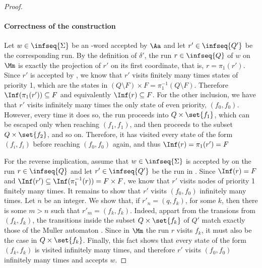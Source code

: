 \begin{proof}
    \paragraph{Correctness of the construction}
    Let $w \in \infseq{\Sigma}$ be an \w-word accepted by $\Aa$ and let $r' \in \infseq{Q'}$
    be the corresponding run.
    By the definition of $\delta'$, the run $r \in \infseq{Q}$ of $w$ on $\Mm$
    is exactly the projection of $r'$ on its first coordinate, that is, $r = \pi_1(r')$.
    Since $r'$ is accepted by \Aa, we know that $r'$
    visits finitely many times states of priority 1, which are the
    states in $(Q \setminus F) \times F = \pi^{-1}_1(Q \setminus F)$.
    Therefore $\Inf(\pi_1(r')) \subseteq F$ and equivalently $\Inf(r) \subseteq F$.
    For the other inclusion, we have that $r'$ visits infinitely many
    times the only state of even priority, $(f_0, f_0)$. However,
    every time it does so, the run proceeds into $Q \times \set{f_1}$,
    which can be escaped only when reaching $(f_1, f_1)$,
    and then proceeds to the subset $Q \times \set{f_2}$, and so on.
    Therefore, it has visited every state of the form $(f_i, f_i)$
    before reaching $(f_0, f_0)$ again, and thus $\Inf(r) = \pi_1(r') = F$

    For the reverse implication, assume that $w \in \infseq{\Sigma}$ is accepted by \Mm
    on the run $r \in \infseq{Q}$ and let $r' \in \infseq{Q'}$ be the run in \Aa.
    Since $\Inf(r) = F$ and $\Inf(r') \subseteq \Inf(\pi^{-1}_1(r)) = F \times F$,
    we know that $r'$ visits nodes of priority 1 finitely many times.
    It remains to show that $r'$ visits $(f_0, f_0)$ infinitely many times.
    Let $n$ be an integer. We show that, if $r'_n = (q, f_k)$, for some $k$,
    then there is some $m > n$ such that $r'_m = (f_k, f_k)$.
    Indeed, appart from the transions from $(f_k, f_k)$, the transitions
    inside the subset $Q \times \set{f_k}$ of $Q'$ match exactly those of the
    Muller automaton \Mm. Since in $\Mm$ the run $r$ visits $f_k$,
    it must also be the case in $Q \times \set{f_k}$.
    Finally, this fact shows that every state of the form $(f_k, f_k)$ is
    visited infinitely many times, and therefore $r'$
    visits $(f_0, f_0)$ infinitely many times and accepts $w$.


\end{proof}
